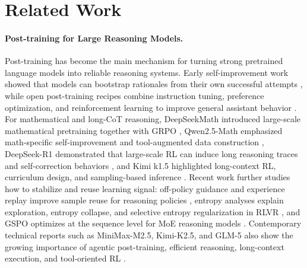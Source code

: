 \section{Related Work}

\paragraph{Post-training for Large Reasoning Models.}
Post-training has become the main mechanism for turning strong pretrained
language models into reliable reasoning systems. Early self-improvement work
showed that models can bootstrap rationales from their own successful attempts
\citep{zelikman2022star}, while open post-training recipes combine instruction
tuning, preference optimization, and reinforcement learning to improve general
assistant behavior \citep{lambert2024tulu}. For mathematical and long-CoT
reasoning, DeepSeekMath introduced large-scale mathematical pretraining together
with GRPO \citep{shao2024deepseekmath}, Qwen2.5-Math emphasized math-specific
self-improvement and tool-augmented data construction
\citep{yang2024qwen25math}, DeepSeek-R1 demonstrated that large-scale RL can
induce long reasoning traces and self-correction behaviors \citep{r1}, and Kimi
k1.5 highlighted long-context RL, curriculum design, and sampling-based
inference \citep{kimi2025k15}. Recent work further studies how to stabilize and
reuse learning signal: off-policy guidance and experience replay improve sample
reuse for reasoning policies \citep{yan2025learning,exgrpo}, entropy analyses
explain exploration, entropy collapse, and selective entropy regularization in
RLVR \citep{cui2025entropy,jiang2025rethinkingentropy}, and GSPO optimizes at
the sequence level for MoE reasoning models \citep{zheng2025gspo}. Contemporary
technical reports such as MiniMax-M2.5, Kimi-K2.5, and GLM-5 also show the
growing importance of agentic post-training, efficient reasoning, long-context
execution, and tool-oriented RL \citep{minimax2026m25,moonshot2026kimi25,zai2026glm5}.


